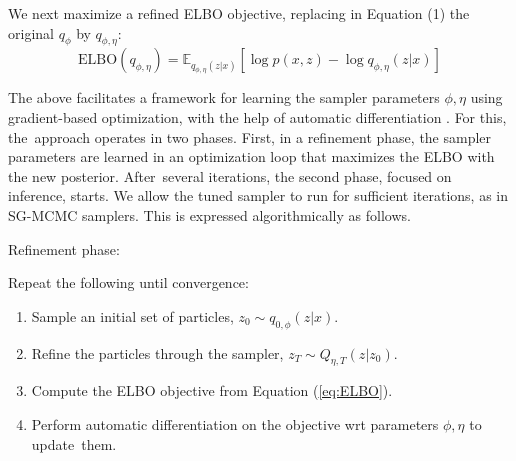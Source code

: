 We next maximize a refined ELBO objective, replacing in Equation (1) the 
original $q_{\phi }$ 
by $q_{\phi, \eta}$:
\begin{equation}\label{eq:ELBO}
\mbox{ELBO}(q_{\phi,\eta}) = \mathbb{E}_{q_{\phi, \eta}(z|x)} \left[ \log p(x,z) - \log q_{\phi, \eta}(z|x)\right]
\end{equation}

The above facilitates a framework for learning the sampler parameters $\phi, \eta$ using gradient-based optimization, with the help of automatic differentiation \cite{baydin2017automatic}.
For this, the~approach operates in two phases.
First, in a refinement phase, the sampler parameters are learned in an optimization loop that maximizes the ELBO with the new posterior. After~several iterations, the second phase,
focused on inference, starts.
We allow the tuned sampler to run for
sufficient iterations, as in SG-MCMC samplers.
This is expressed algorithmically as follows.


Refinement phase: 

Repeat the following until convergence:
    \begin{enumerate}
    \item Sample an initial set of particles, $z_0 \sim q_{0,\phi}(z|x)$.
    \item Refine the particles through the sampler, $z_T \sim Q_{\eta, T}(z|z_0)$.
    \item Compute the ELBO objective from Equation (\ref{eq:ELBO}). %
    \item Perform automatic differentiation on the objective wrt parameters $\phi, \eta$ to update~them.
\end{enumerate}


